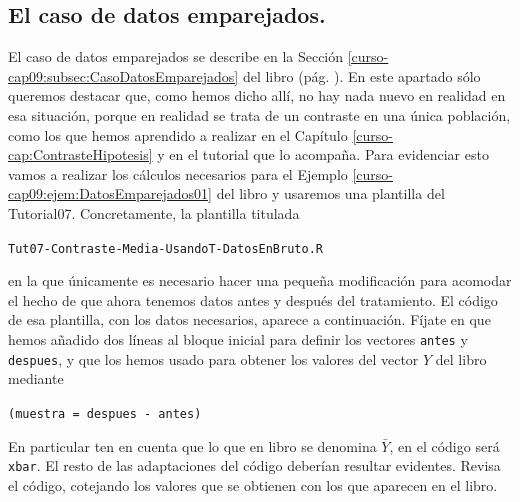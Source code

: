 \documentclass[10pt,a4paper]{article}\usepackage[]{graphicx}\usepackage[]{color}
\newcounter {cont01}
\begin{document}
\subsection{El caso de datos emparejados.}
\label{tut09:subsec:DatosEmparejados1}

El caso de datos emparejados se describe en la Sección \ref{curso-cap09:subsec:CasoDatosEmparejados} del libro (pág. \pageref{curso-cap09:subsec:CasoDatosEmparejados}). En este apartado sólo queremos destacar que, como hemos dicho allí, no hay nada nuevo en realidad en esa situación, porque en realidad se trata de un contraste en una única población, como los que hemos aprendido a realizar en el Capítulo \ref{curso-cap:ContrasteHipotesis} y en el tutorial que lo acompaña. Para evidenciar esto vamos a realizar los cálculos necesarios para el Ejemplo \ref{curso-cap09:ejem:DatosEmparejados01} del libro y usaremos una plantilla del Tutorial07. Concretamente, la plantilla titulada
\begin{center}
  {\tt Tut07-Contraste-Media-UsandoT-DatosEnBruto.R}
\end{center}
en la que únicamente es necesario hacer una pequeña modificación para acomodar el hecho de que ahora tenemos datos antes y después del tratamiento. El código de esa plantilla, con los datos necesarios, aparece a continuación. Fíjate en que hemos añadido dos líneas al bloque inicial para definir los vectores {\tt antes} y {\tt despues}, y que los hemos  usado para obtener los valores del vector $Y$ del libro mediante
\begin{center}
  {\tt (muestra = despues - antes)}
\end{center}
En particular ten en cuenta que lo que en libro se denomina $\bar Y$, en el código será {\tt xbar}. El resto de las adaptaciones del código deberían resultar evidentes. Revisa el código, cotejando los valores que se obtienen con los que aparecen en el libro.
\end{document}
